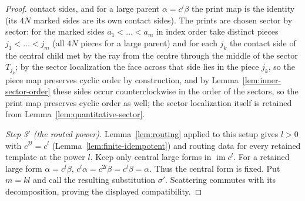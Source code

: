 \documentclass[11pt,a4paper]{article}
\theoremstyle{remark}
\begin{document}
\begin{proof}
contact sides, and for a large parent $\alpha=c^l\beta$ the print map is the
identity (its $4N$ marked sides are its own contact sides).  The prints
are chosen sector by sector: for the marked sides $a_1<\dots<a_m$ in index
order take distinct pieces $j_1<\dots<j_m$ (all $4N$ pieces for a large
parent) and for each $j_k$ the contact side of the central child met by the
ray from the centre through the middle of the sector $T_{j_k}$; by the
sector localization the face across that side lies in the piece $j_k$, so
the piece map preserves cyclic order by construction, and by
Lemma~\ref{lem:inner-sector-order} these sides occur counterclockwise in
the order of the sectors, so the print map preserves cyclic order as well;
the sector localization itself is retained from
Lemma~\ref{lem:quantitative-sector}.

\emph{Step 3$'$ (the routed power).}  Lemma~\ref{lem:routing} applied to this
setup gives $l>0$ with $c^{2l}=c^l$ (Lemma~\ref{lem:finite-idempotent}) and
routing data for every retained template at the power $l$.  Keep only central
large forms in $\operatorname{im}c^l$.  For a retained large form
$\alpha=c^l\beta$, $c^l\alpha=c^{2l}\beta=c^l\beta=\alpha$.  Thus the central
form is fixed.  Put $m=kl$ and call the resulting substitution $\sigma'$.
Scattering commutes with its decomposition, proving the displayed
compatibility.


\end{proof}
\end{document}
